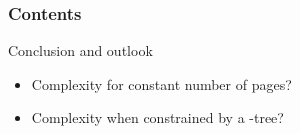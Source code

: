 
\begin{frame}
\frametitle{Contents}
\tableofcontents
\end{frame}

\miniframeson

%

%


%

\miniframesoff

%
%
%

\begin{frame}{Conclusion and outlook}
\begin{overprint}
\vspace{-1.8em}
\begin{itemize}
  \item Complexity for constant number of pages?
  \item Complexity when constrained by a \PT-tree?
\end{itemize}

\end{overprint}
\end{frame}


